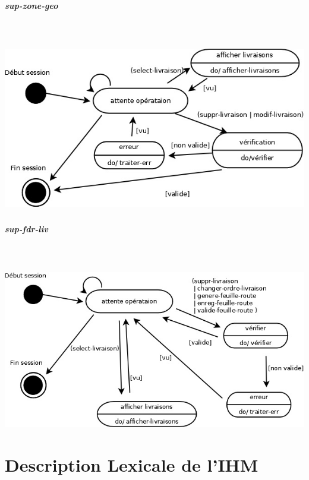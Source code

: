 \documentclass{report}
\begin{document}
\paragraph{sup-zone-geo}
~~\\
~~\\
\includegraphics[scale = 0.5, angle = 0]{images/dec-sup-zone-geo.jpg}

\paragraph{}

\paragraph{sup-fdr-liv}
~~\\
~~\\
\includegraphics[scale = 0.5, angle = 0]{images/dec-sup-fdr-liv.jpg}






\chapter{Description Lexicale de l'IHM}
\end{document}

